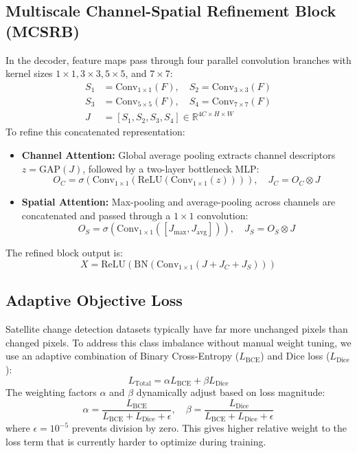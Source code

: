 \documentclass[final,5p,times,twocolumn]{elsarticle}
\begin{document}
\subsection{Multiscale Channel-Spatial Refinement Block (MCSRB)}
In the decoder, feature maps pass through four parallel convolution branches with kernel sizes $1\times1, 3\times3, 5\times5$, and $7\times7$:
\begin{align}
    S_1 &= \text{Conv}_{1\times1}(F), \quad S_2 = \text{Conv}_{3\times3}(F) \\
    S_3 &= \text{Conv}_{5\times5}(F), \quad S_4 = \text{Conv}_{7\times7}(F) \\
    J &= [S_1, S_2, S_3, S_4] \in \mathbb{R}^{4C \times H \times W}
\end{align}
To refine this concatenated representation:
\begin{itemize}
    \item \textbf{Channel Attention:} Global average pooling extracts channel descriptors $z = \text{GAP}(J)$, followed by a two-layer bottleneck MLP:
    \begin{equation}
        O_C = \sigma\left(\text{Conv}_{1\times1}(\text{ReLU}(\text{Conv}_{1\times1}(z)))\right), \quad J_C = O_C \otimes J
    \end{equation}
    \item \textbf{Spatial Attention:} Max-pooling and average-pooling across channels are concatenated and passed through a $1\times1$ convolution:
    \begin{equation}
        O_S = \sigma\left(\text{Conv}_{1\times1}([J_{\max}, J_{\text{avg}}])\right), \quad J_S = O_S \otimes J
    \end{equation}
\end{itemize}
The refined block output is:
\begin{equation}
    X = \text{ReLU}\left(\text{BN}\left(\text{Conv}_{1\times1}(J + J_C + J_S)\right)\right)
\end{equation}

\subsection{Adaptive Objective Loss}
Satellite change detection datasets typically have far more unchanged pixels than changed pixels. To address this class imbalance without manual weight tuning, we use an adaptive combination of Binary Cross-Entropy ($L_{\text{BCE}}$) and Dice loss ($L_{\text{Dice}}$):
\begin{equation}
    L_{\text{Total}} = \alpha L_{\text{BCE}} + \beta L_{\text{Dice}}
\end{equation}
The weighting factors $\alpha$ and $\beta$ dynamically adjust based on loss magnitude:
\begin{equation}
    \alpha = \frac{L_{\text{BCE}}}{L_{\text{BCE}} + L_{\text{Dice}} + \epsilon}, \quad \beta = \frac{L_{\text{Dice}}}{L_{\text{BCE}} + L_{\text{Dice}} + \epsilon}
\end{equation}
where $\epsilon = 10^{-5}$ prevents division by zero. This gives higher relative weight to the loss term that is currently harder to optimize during training.
\end{document}
